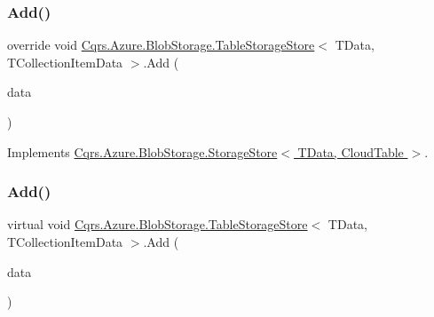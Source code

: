 \subsubsection{\texorpdfstring{Add()}{Add()}\hspace{0.1cm}{\footnotesize\ttfamily [1/6]}}
{\footnotesize\ttfamily override void \hyperlink{classCqrs_1_1Azure_1_1BlobStorage_1_1TableStorageStore}{Cqrs.\+Azure.\+Blob\+Storage.\+Table\+Storage\+Store}$<$ T\+Data, T\+Collection\+Item\+Data $>$.Add (\begin{DoxyParamCaption}\item[{T\+Data}]{data }\end{DoxyParamCaption})\hspace{0.3cm}{\ttfamily [virtual]}}



Implements \hyperlink{classCqrs_1_1Azure_1_1BlobStorage_1_1StorageStore_af56bdbd7fa6650aaef5c0bab9ed55f1a_af56bdbd7fa6650aaef5c0bab9ed55f1a}{Cqrs.\+Azure.\+Blob\+Storage.\+Storage\+Store$<$ T\+Data, Cloud\+Table $>$}.

\mbox{\label{classCqrs_1_1Azure_1_1BlobStorage_1_1TableStorageStore_aa8e6b41c32dd8f81d5ff852693e7979d_aa8e6b41c32dd8f81d5ff852693e7979d}} 
\subsubsection{\texorpdfstring{Add()}{Add()}\hspace{0.1cm}{\footnotesize\ttfamily [2/6]}}
{\footnotesize\ttfamily virtual void \hyperlink{classCqrs_1_1Azure_1_1BlobStorage_1_1TableStorageStore}{Cqrs.\+Azure.\+Blob\+Storage.\+Table\+Storage\+Store}$<$ T\+Data, T\+Collection\+Item\+Data $>$.Add (\begin{DoxyParamCaption}\item[{I\+Table\+Entity}]{data }\end{DoxyParamCaption})\hspace{0.3cm}{\ttfamily [virtual]}}

\mbox{\label{classCqrs_1_1Azure_1_1BlobStorage_1_1TableStorageStore_a2b10c02a19150d5a68e6dcb4810ea8a1_a2b10c02a19150d5a68e6dcb4810ea8a1}} 
